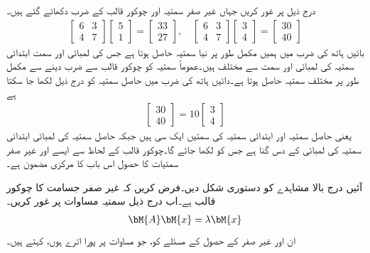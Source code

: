 درج ذیل پر غور کریں جہاں غیر صفر سمتیہ اور چوکور قالب کے ضرب دکھائے گئے ہیں۔
\begin{align}\label{مساوات_امتیازی_پہلی_مثال}
\begin{bmatrix}6&3\\4&7  \end{bmatrix}\begin{bmatrix} 5\\1 \end{bmatrix}=\begin{bmatrix}33\\27  \end{bmatrix},\quad \begin{bmatrix}6&3\\4&7  \end{bmatrix}\begin{bmatrix} 3\\4 \end{bmatrix}=\begin{bmatrix}30\\40  \end{bmatrix}
\end{align} 
بائیں ہاتھ کی ضرب میں ہمیں مکمل طور پر نیا سمتیہ حاصل ہوتا ہے جس کی لمبائی اور سمت ابتدائی سمتیہ کی لمبائی اور سمت  سے مختلف ہیں۔عموماً  سمتیہ کو چوکور قالب سے ضرب دینے  سے مکمل طور پر مختلف سمتیہ حاصل ہوتا ہے۔دائیں ہاتھ کی ضرب میں حاصل سمتیہ کو درج ذیل لکھا جا سکتا ہے 
\begin{align*}
\begin{bmatrix}30\\40  \end{bmatrix}=10\begin{bmatrix}3\\4  \end{bmatrix}
\end{align*}
یعنی حاصل سمتیہ اور ابتدائی سمتیہ کی سمتیں ایک سی ہیں جبکہ حاصل سمتیہ کی لمبائی ابتدائی سمتیہ کی لمبائی کے دس گنا ہے جس کو  لکھا جائے گا۔چوکور قالب  کے لحاظ سے  ایسے  اور غیر صفر سمتیات کا حصول اس باب کا مرکزی مضمون ہے۔  

آئیں درج بالا مشاہدے کو  دستوری شکل دیں۔فرض کریں کہ  غیر صفر  جسامت کا چوکور قالب ہے۔اب درج ذیل سمتیہ  مساوات پر غور کریں۔
\begin{align}\label{مساوات_امتیازی_مسئلہ_ب}
\bM{A}\bM{x}=\lambda \bM{x}
\end{align}
ان  اور غیر صفر  کے حصول کے مسئلے کو، جو مساوات  پر پورا اترے ہوں،   کہتے ہیں۔

